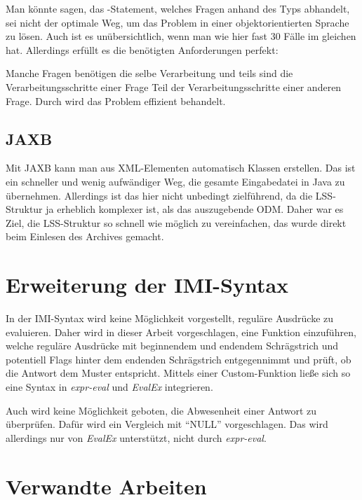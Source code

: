 Man könnte sagen, das -Statement, welches Fragen anhand des Typs abhandelt, sei nicht der optimale Weg, um das Problem in einer objektorientierten Sprache zu lösen.
Auch ist es unübersichtlich, wenn man wie hier fast 30 Fälle im gleichen  hat.
Allerdings erfüllt es die benötigten Anforderungen perfekt:

Manche Fragen benötigen die selbe Verarbeitung und teils sind die Verarbeitungsschritte einer Frage Teil der Verarbeitungsschritte einer anderen Frage.
Durch  wird das Problem effizient behandelt.

\subsection{JAXB}

Mit JAXB kann man aus XML-Elementen automatisch Klassen erstellen. Das ist ein schneller und wenig aufwändiger Weg, die gesamte Eingabedatei in Java zu übernehmen.
Allerdings ist das hier nicht unbedingt zielführend, da die LSS-Struktur ja erheblich komplexer ist, als das auszugebende ODM.
Daher war es Ziel, die LSS-Struktur so schnell wie möglich zu vereinfachen, das wurde direkt beim Einlesen des Archives gemacht.

\section{Erweiterung der IMI-Syntax}
\label{d:imi}

In der IMI-Syntax wird keine Möglichkeit vorgestellt, reguläre Ausdrücke zu evaluieren.
Daher wird in dieser Arbeit vorgeschlagen, eine Funktion  einzuführen, welche reguläre Ausdrücke mit beginnendem und endendem Schrägstrich und potentiell Flags hinter dem endenden Schrägstrich entgegennimmt und prüft, ob die Antwort dem Muster entspricht.
Mittels einer Custom-Funktion ließe sich so eine Syntax in \textit{expr-eval} und \textit{EvalEx} integrieren.

Auch wird keine Möglichkeit geboten, die Abwesenheit einer Antwort zu überprüfen. Dafür wird ein Vergleich mit \enquote{NULL} vorgeschlagen.
Das wird allerdings nur von \textit{EvalEx} unterstützt, nicht durch \textit{expr-eval}.

\section{Verwandte Arbeiten}


